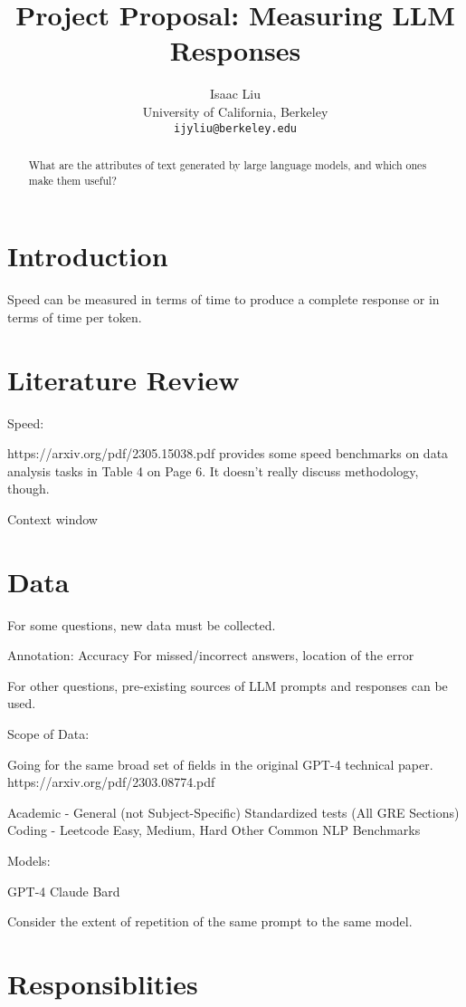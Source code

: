 \documentclass[11pt]{article}
\title{Project Proposal: Measuring LLM Responses}
\author{Isaac Liu \\
  University of California, Berkeley \\
  \texttt{ijyliu@berkeley.edu}}
\begin{document}
\maketitle
\begin{abstract}
What are the attributes of text generated by large language models, and which ones make them useful?
\end{abstract}

\section{Introduction}

Speed can be measured in terms of time to produce a complete response or in terms of time per token.

\section{Literature Review}

Speed: 

https://arxiv.org/pdf/2305.15038.pdf provides some speed benchmarks on data analysis tasks in Table 4 on Page 6. It doesn't really discuss methodology, though.

Context window

\section{Data}

For some questions, new data must be collected.

Annotation:
Accuracy
For missed/incorrect answers, location of the error

For other questions, pre-existing sources of LLM prompts and responses can be used.

Scope of Data:

Going for the same broad set of fields in the original GPT-4 technical paper. https://arxiv.org/pdf/2303.08774.pdf

Academic - General (not Subject-Specific) Standardized tests (All GRE Sections)
Coding - Leetcode Easy, Medium, Hard
Other Common NLP Benchmarks

Models:

GPT-4
Claude
Bard

Consider the extent of repetition of the same prompt to the same model.

\section{Responsiblities}
\end{document}
